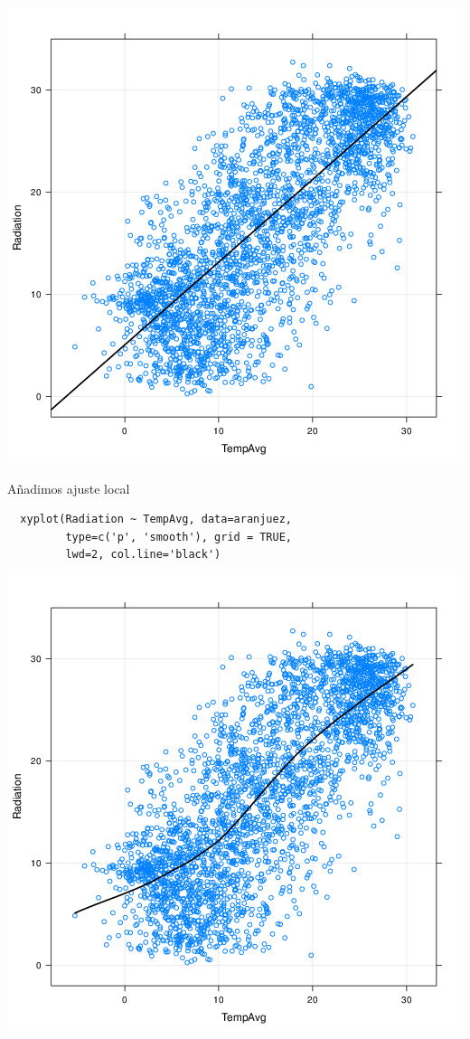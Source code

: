 \documentclass[xcolor={usenames,svgnames,dvipsnames}]{beamer}
\begin{document}
\begin{frame}[label=sec-3-7]{}
\includegraphics[width=.9\linewidth]{figs/xyplotPRG.png}
\end{frame}



\begin{frame}[fragile,label=sec-3-8]{Añadimos ajuste local}
 \lstset{language=R,label= ,caption= ,numbers=none}
\begin{lstlisting}
  xyplot(Radiation ~ TempAvg, data=aranjuez,
         type=c('p', 'smooth'), grid = TRUE,
         lwd=2, col.line='black')
\end{lstlisting}
\end{frame}

\begin{frame}[label=sec-3-9]{}
\includegraphics[width=.9\linewidth]{figs/xyplotSmooth.png}
\end{frame}
\end{document}
